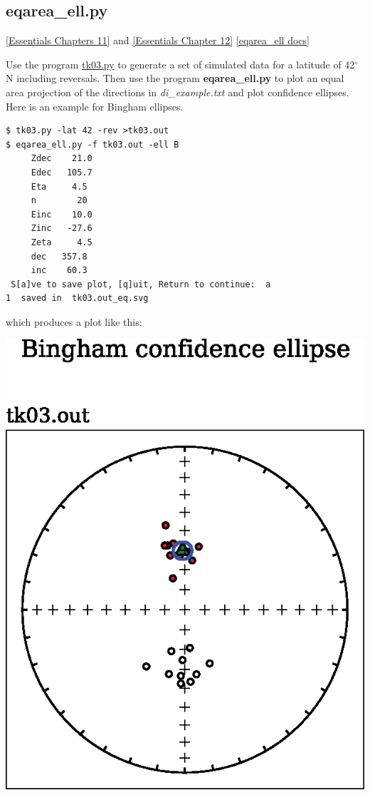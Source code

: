 \documentclass[11pt]{book}
\begin{document}
{{
\subsection{eqarea\_ell.py}
\href{http://earthref.org/MAGIC/books/Tauxe/Essentials/WebBook3ch11.html#ch11}{ [Essentials Chapters 11]} and \href{http://earthref.org/MAGIC/books/Tauxe/Essentials/WebBook3ch12.html#ch12}{ [Essentials Chapter 12]}
\href{https://github.com/PmagPy/PmagPy/blob/master/programs/eqarea_ell.py}{[eqarea\_ell docs]}

Use the program \href{#tk03.py}{tk03.py} to generate a set of simulated data for a latitude of 42$^{\circ}$N including reversals.
Then use the program {\bf eqarea\_ell.py} to
plot an equal area projection of the directions in {\it di\_example.txt} and plot confidence ellipses.  Here is an example for
Bingham ellipses.


\begin{verbatim}
$ tk03.py -lat 42 -rev >tk03.out
$ eqarea_ell.py -f tk03.out -ell B
     Zdec    21.0
     Edec   105.7
     Eta     4.5
     n        20
     Einc    10.0
     Zinc   -27.6
     Zeta     4.5
     dec   357.8
     inc    60.3
 S[a]ve to save plot, [q]uit, Return to continue:  a
1  saved in  tk03.out_eq.svg
\end{verbatim}

which produces a plot like this:

\includegraphics[width=12 cm]{EPSfiles/eqarea_ell.eps}

}}
\end{document}
